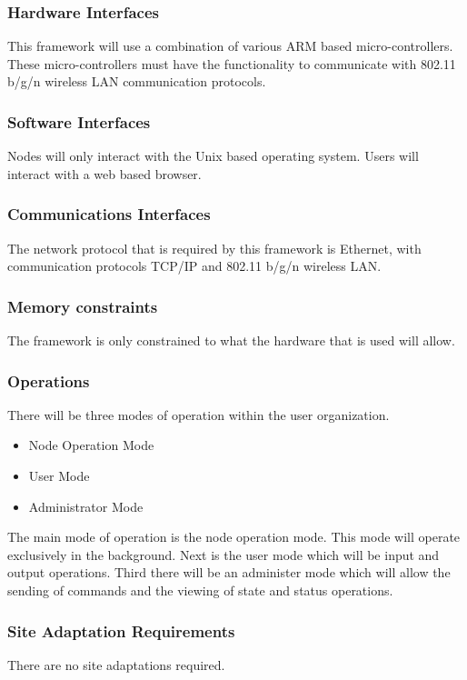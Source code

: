 \documentclass[draftclsnofoot, onecolumn, compsoc, 10pt]{IEEEtran}
\begin{document}
\subsubsection{Hardware Interfaces}
This framework will use a combination of various ARM based micro-controllers. These micro-controllers must have the functionality to communicate with 802.11 b/g/n wireless LAN communication protocols.

\subsubsection{Software Interfaces}
Nodes will only interact with the Unix based operating system. Users will interact with a web based browser.

\subsubsection{Communications Interfaces}
The network protocol that is required by this framework is Ethernet, with communication protocols TCP/IP and 802.11 b/g/n wireless LAN.

\subsubsection{Memory constraints}
The framework is only constrained to what the hardware that is used will allow.
 
\subsubsection{Operations}
There will be three modes of operation within the user organization. 
\begin{itemize}
\item Node Operation Mode \\
\item User Mode \\ 
\item Administrator Mode
\end{itemize}
The main mode of operation is the node operation mode. This mode will operate exclusively in the background. Next is the user mode which will be input and output operations. Third there will be an administer mode which will allow the sending of commands and the viewing of state and status operations.

\subsubsection{Site Adaptation Requirements}
There are no site adaptations required.
\end{document}
